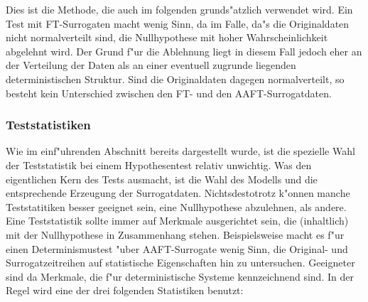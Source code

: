 Dies ist die Methode, die auch im folgenden grunds"atzlich verwendet wird. Ein Test mit
FT-Surrogaten macht wenig Sinn, da im Falle, da"s die Originaldaten nicht normalverteilt
sind, die Nullhypothese mit hoher Wahrscheinlichkeit abgelehnt wird. Der Grund f"ur die
Ablehnung liegt in diesem Fall jedoch eher an der Verteilung der Daten als an einer 
eventuell zugrunde liegenden deterministischen Struktur. Sind die Originaldaten dagegen
normalverteilt, so besteht kein Unterschied zwischen den FT- und den AAFT-Surrogatdaten.


\subsubsection{Teststatistiken}
Wie im einf"uhrenden Abschnitt bereits dargestellt wurde, ist die spezielle Wahl der
Teststatistik bei einem Hypothesentest relativ unwichtig. Was den eigentlichen Kern des
Tests ausmacht, ist die Wahl des Modells und die entsprechende Erzeugung der
Surrogatdaten. Nichtsdestotrotz k"onnen manche Teststatitiken besser geeignet sein, eine
Nullhypothese abzulehnen, als andere. Eine Teststatistik sollte immer auf Merkmale
ausgerichtet sein, die \naja(inhaltlich) mit der Nullhypothese in Zusammenhang stehen.
Beispielsweise macht es f"ur einen Determinismustest "uber AAFT-Surrogate wenig Sinn, die
Original- und Surrogatzeitreihen auf statistische Eigenschaften hin zu untersuchen.
Geeigneter sind da Merkmale, die f"ur deterministische Systeme kennzeichnend sind. In der
Regel wird eine der drei folgenden Statistiken benutzt:
